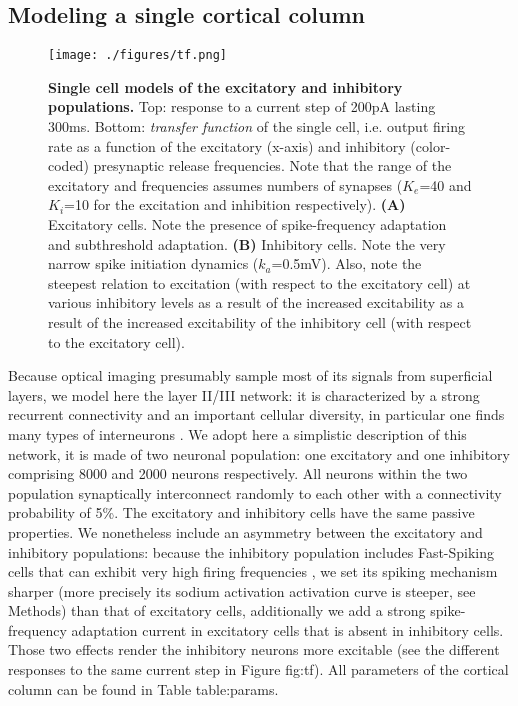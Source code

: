 \documentclass[8pt, colorlinks, a4paper]{article}
\renewcommand\ref{}
\begin{document}
\subsection{Modeling a single cortical column}
\label{sec-4-1}

\begin{figure*}
\centering
\texttt{[image: ./figures/tf.png]}
\caption{\label{fig:tf}\textbf{Single cell models of the excitatory and inhibitory populations.} Top: response to a current step of 200pA lasting 300ms. Bottom: \emph{transfer function} of the single cell, i.e. output firing rate as a function of the excitatory (x-axis) and inhibitory (color-coded) presynaptic release frequencies. Note that the range of the excitatory and frequencies assumes numbers of synapses (\(K_e\)=40 and \(K_i\)=10 for the excitation and inhibition respectively).  \textbf{(A)} Excitatory cells. Note the presence of spike-frequency adaptation and subthreshold adaptation. \textbf{(B)} Inhibitory cells. Note the very narrow spike initiation dynamics (\(k_a\)=0.5mV). Also, note the steepest relation to excitation (with respect to the excitatory cell) at various inhibitory levels as a result of the increased excitability as a result of the increased excitability of the inhibitory cell (with respect to the excitatory cell).}
\end{figure*}

Because optical imaging presumably sample most of its signals from
superficial layers, we model here the layer II/III network: it is
characterized by a strong recurrent connectivity and an important
cellular diversity, in particular one finds many types of interneurons
\cite{Markram2004,Ascoli2008a}. We adopt here a simplistic description
of this network, it is made of two neuronal population: one excitatory
and one inhibitory comprising 8000 and 2000 neurons respectively. All
neurons within the two population synaptically interconnect randomly
to each other with a connectivity probability of 5\%. The excitatory
and inhibitory cells have the same passive properties. We nonetheless
include an asymmetry between the excitatory and inhibitory
populations: because the inhibitory population includes Fast-Spiking
cells that can exhibit very high firing frequencies
\cite{Markram2004}, we set its spiking mechanism sharper (more
precisely its sodium activation activation curve is steeper, see
Methods) than that of excitatory cells, additionally we add a strong
spike-frequency adaptation current in excitatory cells that is absent
in inhibitory cells. Those two effects render the inhibitory neurons
more excitable (see the different responses to the same current step
in Figure \ref{fig:tf}). All parameters of the cortical column can be
found in Table \ref{table:params}.
\end{document}
